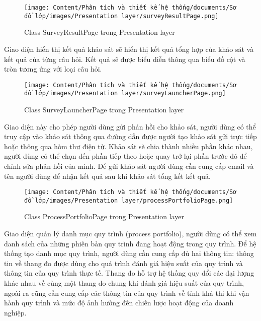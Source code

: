 \begin{figure}[H]
    \centering
    \texttt{[image: Content/Phân tích và thiết kế hệ thống/documents/Sơ đồ lớp/images/Presentation layer/surveyResultPage.png]}
    \vspace{0.5cm}
    \caption{Class SurveyResultPage trong Presentation layer}
    \label{fig:Class SurveyResultPage trong Presentation layer}
\end{figure}
Giao diện hiển thị kết quả khảo sát sẽ hiển thị kết quả tổng hợp của khảo sát và kết quả của từng câu hỏi. Kết quả sẽ được biểu diễn thông qua biểu đồ cột và tròn tương ứng với loại câu hỏi.

\begin{figure}[H]
    \centering
    \texttt{[image: Content/Phân tích và thiết kế hệ thống/documents/Sơ đồ lớp/images/Presentation layer/surveyLauncherPage.png]}
    \vspace{0.5cm}
    \caption{Class SurveyLauncherPage trong Presentation layer}
    \label{fig:Class SurveyLauncherPage trong Presentation layer}
\end{figure}
Giao diện này cho phép người dùng gửi phản hồi cho khảo sát, người dùng có thể truy cập vào khảo sát thông qua đường dẫn được người tạo khảo sát gửi trực tiếp hoặc thông qua hòm thư điện tử. Khảo sát sẽ chia thành nhiều phần khác nhau, người dùng có thể chọn đến phần tiếp theo hoặc quay trở lại phần trước đó để chỉnh sửa phản hồi của mình. Để gửi khảo sát người dùng cần cung cấp email và tên người dùng để nhận kết quả sau khi khảo sát tổng kết kết quả.

\begin{figure}[H]
    \centering
    \texttt{[image: Content/Phân tích và thiết kế hệ thống/documents/Sơ đồ lớp/images/Presentation layer/processPortfolioPage.png]}
    \vspace{0.5cm}
    \caption{Class ProcessPortfolioPage trong Presentation layer}
    \label{fig:Class ProcessPortfolioPage trong Presentation layer}
\end{figure}
Giao diện quản lý danh mục quy trình (process portfolio), người dùng có thể xem danh sách của những phiên bản quy trình đang hoạt động trong quy trình. Để hệ thống tạo danh mục quy trình, người dùng cần cung cấp đủ hai thông tin: thông tin về thang đo được dùng cho quá trình đánh giá hiệu suất của quy trình và thông tin của quy trình thực tế. Thang đo hỗ trợ hệ thống quy đổi các đại lượng khác nhau về cùng một thang đo chung khi đánh giá hiệu suất của quy trình, ngoài ra cũng cần cung cấp các thông tin của quy trình về tính khả thi khi vận hành quy trình và mức độ ảnh hưởng đến chiến lược hoạt động của doanh nghiệp.